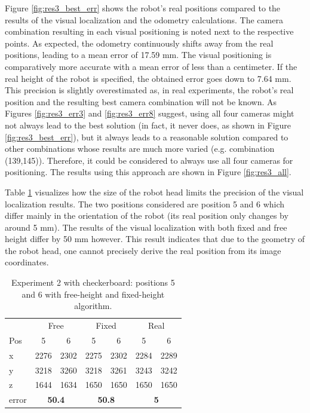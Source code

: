 Figure \ref{fig:res3_best_err} shows the robot's real positions compared to the results of the visual localization and the odometry calculations. 
The camera combination resulting in each visual positioning is noted next to the respective points. 
As expected, the odometry continuously shifts away from the real positions, leading to a mean error of 17.59 mm. 
The visual positioning is comparatively more accurate with a mean error of less than a centimeter. 
If the real height of the robot is specified, the obtained error goes down to 7.64 mm.
This precision is slightly overestimated as, in real experiments, the robot's real position and the resulting best camera combination will not be known. 
As Figures \ref{fig:res3_err3} and \ref{fig:res3_err8} suggest, using all four cameras might not always lead to the best solution (in fact, it never does, as shown in Figure \ref{fig:res3_best_err}), but it always leads to a reasonable solution compared to other combinations whose results are much more varied (e.g. combination (139,145)). 
Therefore, it could be considered to always use all four cameras for positioning. 
The results using this approach are shown in Figure \ref{fig:res3_all}.

Table \ref{tab:res3_errors} visualizes how the size of the robot head limits the precision of the visual localization results. 
The two positions considered are position 5 and 6 which differ mainly in the orientation of the robot (its real position only changes by around 5 mm).
The results of the visual localization with both fixed and free height differ by 50 mm however. 
This result indicates that due to the geometry of the robot head, one cannot precisely derive the real position from its image coordinates.

\begin{table}
\begin{center}
\caption{Experiment 2 with checkerboard: positions 5 and 6 with free-height and fixed-height algorithm.}
\begin{tabular}{lcccccc}
\toprule
& \multicolumn{2}{c}{Free} & \multicolumn{2}{c}{Fixed} & \multicolumn{2}{c}{Real} \\
Pos & 5 & 6 & 5 & 6 & 5 & 6\\
\midrule
x&2276& 2302& 2275& 2302 & 2284 & 2289\\
y&3218& 3260& 3218& 3261 & 3243 & 3242\\
z&1644& 1634& 1650& 1650 & 1650 & 1650\\
\midrule
error & \multicolumn{2}{c}{\textbf{50.4}}&\multicolumn{2}{c}{\textbf{50.8}} &\multicolumn{2}{c}{\textbf{5}}\\
\bottomrule
\end{tabular}
\label{tab:res3_errors}
\end{center}
\end{table}

